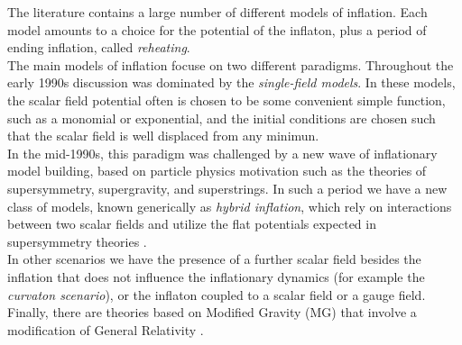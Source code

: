 \documentclass[11pt,a4paper,twoside]{book}
\begin{document}
The literature contains a large number of different models of inflation. Each model amounts to a choice for the potential  of the inflaton, plus a period of ending inflation, called \textit{reheating}.\\
The main models of inflation focuse on two different paradigms. Throughout the early 1990s discussion was dominated by the \textit{single-field models}. In these models, the scalar field potential often is chosen to be some convenient simple function, such as a monomial or exponential, and the initial conditions are chosen such that the scalar field is well displaced from any minimun.\\
In the mid-1990s, this paradigm was challenged by a new wave of inflationary model building, based on particle physics motivation such as the theories of supersymmetry, supergravity, and superstrings. In such a period we have a new class of models, known generically as \textit{hybrid inflation}, which rely on interactions between two scalar fields and utilize the flat potentials expected in supersymmetry theories \cite{Liddle:intro}. \\
In other scenarios we have the presence of a further scalar field besides the inflation that does not influence the inflationary dynamics (for example the \textit{curvaton scenario}), or the inflaton coupled to a scalar field or a gauge field. Finally, there are theories based on Modified Gravity (MG) that involve a modification of General Relativity \cite{GWFromInflation:Intro}.\\
\end{document}
